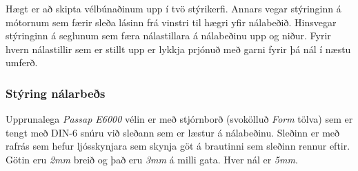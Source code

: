 Hægt er að skipta vélbúnaðinum upp í tvö stýrikerfi. Annars vegar stýringinn á mótornum sem færir sleða lásinn frá vinstri til hægri yfir nálabeðið. Hinsvegar stýringinn á seglunum sem færa nálastillara á nálabeðinu upp og niður. Fyrir hvern nálastillir sem er stillt upp er lykkja prjónuð með garni fyrir þá nál í næstu umferð.
\subsubsection{Stýring nálarbeðs}
Upprunalega \textit{Passap E6000} vélin er með stjórnborð (svokölluð \textit{Form} tölva) sem er tengt með DIN-6 snúru við sleðann sem er læstur á nálabeðinu. Sleðinn er
með rafrás sem hefur ljósskynjara sem skynja göt á brautinni sem sleðinn rennur eftir. Götin eru \textit{2mm} breið og það eru \textit{3mm} á milli gata. Hver nál er \textit{5mm}. 

